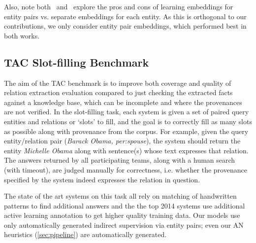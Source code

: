 Also, note both~\citet{toutanova2015representing} and~\citet{limin} explore the pros and cons of learning embeddings for entity pairs vs. separate embeddings for each entity. As this is orthogonal to our contributions, we only consider entity pair embeddings, which performed best in both works.


\subsection{TAC Slot-filling Benchmark}

The aim of the TAC benchmark is to improve both coverage and quality of relation extraction evaluation compared to just checking the extracted facts against a knowledge base, which can be incomplete and where the provenances are not verified. In the slot-filling task, each system is given a set of paired query entities and relations or `slots' to fill, and the goal is to correctly fill as many slots as possible along with provenance from the corpus. For example, given the query entity/relation pair (\emph{Barack Obama, per:spouse}), the system should return the entity \emph{Michelle Obama} along with sentence(s) whose text expresses that relation. The answers returned by all participating teams, along with a human search (with timeout), are judged manually for correctness, i.e. whether the provenance specified by the system indeed expresses the relation in question.


 The state of the art systems on this task all rely on matching of handwritten patterns to find additional answers and the the top 2014 systems use additional active learning annotation to get higher quality training data. Our models use only automatically generated indirect supervision via entity pairs; even our AN heuristics (\ref{sec:pipeline}) are automatically generated.

